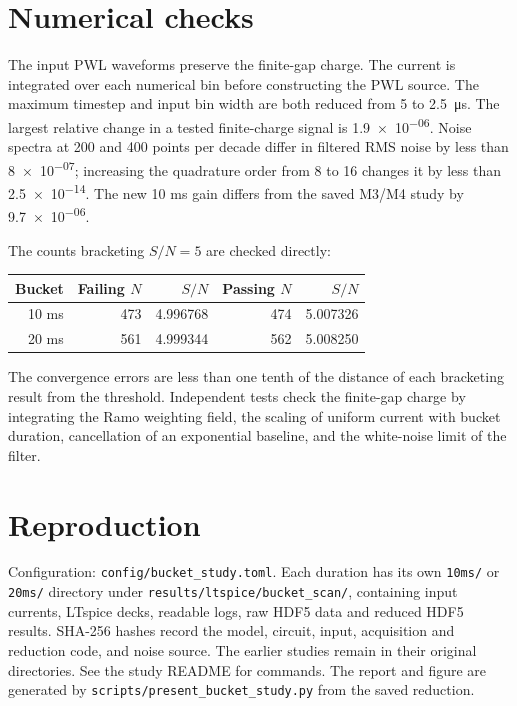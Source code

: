 \documentclass[11pt,a4paper]{article}
\begin{document}
\section{Numerical checks}
The input PWL waveforms preserve the finite-gap charge. The current is
integrated over each numerical bin before constructing the PWL source.
The maximum timestep and input bin width are both reduced from 5 to
\SI{2.5}{\micro\second}. The largest relative change in a tested finite-charge
signal is \num{1.9e-06}. Noise spectra at 200 and 400 points per decade differ in
filtered RMS noise by less than \num{8e-07}; increasing the quadrature order
from 8 to 16 changes it by less than \num{2.5e-14}.
The new 10 ms gain differs from the saved M3/M4 study by \num{9.7e-06}.

The counts bracketing $S/N=5$ are checked directly:
\begin{center}
\begin{tabular}{rrrrr}
\toprule Bucket & Failing $N$ & $S/N$ & Passing $N$ & $S/N$ \\\midrule
10 ms & 473 & 4.996768 & 474 & 5.007326 \\
20 ms & 561 & 4.999344 & 562 & 5.008250 \\
\bottomrule
\end{tabular}
\end{center}
The convergence errors are less than one tenth of the distance of each
bracketing result from the threshold. Independent tests check the finite-gap
charge by integrating the Ramo weighting field, the scaling of uniform current
with bucket duration, cancellation of an exponential baseline, and the
white-noise limit of the filter.

\section{Reproduction}
Configuration: \texttt{config/bucket\_study.toml}.
Each duration has its own \texttt{10ms/} or \texttt{20ms/} directory under
\texttt{results/ltspice/bucket\_scan/}, containing input currents, LTspice decks,
readable logs, raw HDF5 data and reduced HDF5 results. SHA-256 hashes record
the model, circuit, input, acquisition and reduction code, and noise source.
The earlier studies remain in their original directories.
See the study README for commands. The report and figure are generated by
\texttt{scripts/present\_bucket\_study.py} from the saved reduction.
\end{document}
